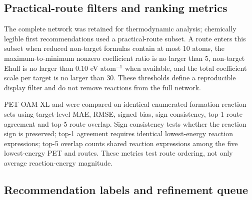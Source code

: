 \documentclass[11pt, letterpaper]{article}
\begin{document}
\subsection*{Practical-route filters and ranking metrics}

The complete network was retained for thermodynamic analysis; chemically legible first recommendations used a practical-route subset. A route enters this subset when reduced non-target formulas contain at most 10 atoms, the maximum-to-minimum nonzero coefficient ratio is no larger than 5, non-target Ehull is no larger than 0.10 eV atom$^{-1}$ when available, and the total coefficient scale per target is no larger than 30. These thresholds define a reproducible display filter and do not remove reactions from the full network.

PET-OAM-XL and \mpform{} were compared on identical enumerated formation-reaction sets using target-level MAE, RMSE, signed bias, sign consistency, top-1 route agreement and top-5 route overlap. Sign consistency tests whether the reaction sign is preserved; top-1 agreement requires identical lowest-energy reaction expressions; top-5 overlap counts shared reaction expressions among the five lowest-energy PET and \mpform{} routes. These metrics test route ordering, not only average reaction-energy magnitude.

\subsection*{Recommendation labels and refinement queue}
\end{document}
